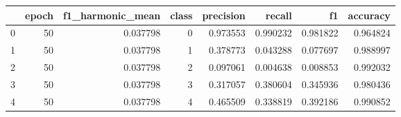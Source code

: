 \begin{tabular}{lrrrrrrr}
\toprule
 & epoch & f1_harmonic_mean & class & precision & recall & f1 & accuracy \\
\midrule
0 & 50 & 0.037798 & 0 & 0.973553 & 0.990232 & 0.981822 & 0.964824 \\
1 & 50 & 0.037798 & 1 & 0.378773 & 0.043288 & 0.077697 & 0.988997 \\
2 & 50 & 0.037798 & 2 & 0.097061 & 0.004638 & 0.008853 & 0.992032 \\
3 & 50 & 0.037798 & 3 & 0.317057 & 0.380604 & 0.345936 & 0.980436 \\
4 & 50 & 0.037798 & 4 & 0.465509 & 0.338819 & 0.392186 & 0.990852 \\
\bottomrule
\end{tabular}
